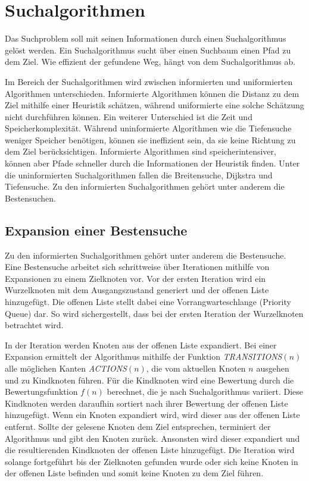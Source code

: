\section{Suchalgorithmen}
\label{chap:suchalgorithmen}

Das Suchproblem soll mit seinen Informationen durch einen Suchalgorithmus gelöst werden. Ein Suchalgorithmus sucht über einen Suchbaum einen Pfad zu dem Ziel. Wie effizient der gefundene Weg, hängt von dem Suchalgorithmus ab. 

Im Bereich der Suchalgorithmen wird zwischen informierten und uniformierten Algorithmen unterschieden. Informierte Algorithmen können die Distanz zu dem Ziel mithilfe einer Heuristik schätzen, während uniformierte eine solche Schätzung nicht durchführen können. Ein weiterer Unterschied ist die Zeit und Speicherkomplexität. Während uninformierte Algorithmen wie die Tiefensuche weniger Speicher benötigen, können sie ineffizient sein, da sie keine Richtung zu dem Ziel berücksichtigen. Informierte Algorithmen sind speicherintensiver, können aber Pfade schneller durch die Informationen der Heuristik finden. Unter die uninformierten Suchalgorithmen fallen die Breitensuche, Dijkstra und Tiefensuche. Zu den informierten Suchalgorithmen gehört unter anderem die Bestensuchen.


\subsection{Expansion einer Bestensuche}
\label{chap:bestensuche}

Zu den informierten Suchalgorithmen gehört unter anderem die Bestensuche. Eine Bestensuche arbeitet sich schrittweise über Iterationen mithilfe von Expansionen zu einem Zielknoten vor. Vor der ersten Iteration wird ein Wurzelknoten mit dem Ausgangszustand generiert und der offenen Liste hinzugefügt. Die offenen Liste stellt dabei eine Vorrangwarteschlange (Priority Queue) dar. So wird sichergestellt, dass bei der ersten Iteration der Wurzelknoten betrachtet wird.

In der Iteration werden Knoten aus der offenen Liste expandiert. Bei einer Expansion ermittelt der Algorithmus mithilfe der Funktion \textit{TRANSITIONS}$(n)$ alle möglichen Kanten \textit{ACTIONS}$(n)$, die vom aktuellen Knoten $n$ ausgehen und zu Kindknoten führen. Für die Kindknoten wird eine Bewertung durch die Bewertungsfunktion $f(n)$ berechnet, die je nach Suchalgorithmus variiert. Diese Kindknoten werden daraufhin sortiert nach ihrer Bewertung der offenen Liste hinzugefügt. Wenn ein Knoten expandiert wird, wird dieser aus der offenen Liste entfernt. Sollte der gelesene Knoten dem Ziel entsprechen, terminiert der Algorithmus und gibt den Knoten zurück. Ansonsten wird dieser expandiert und die resultierenden Kindknoten der offenen Liste hinzugefügt. Die Iteration wird solange fortgeführt bis der Zielknoten gefunden wurde oder sich keine Knoten in der offenen Liste befinden und somit keine Knoten zu dem Ziel führen.

